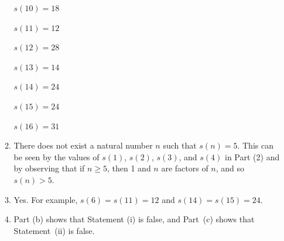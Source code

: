 \documentclass[11pt]{article}
\begin{document}
\begin{enumerate}
\begin{enumerate}
\begin{multicols}{4}
$s( {10} ) = 18$	

$s( {11} ) = 12$	

$s( {12} ) = 28$

$s( {13} ) = 14$	

$s( {14} ) = 24$	

$s( 15 ) = 24$	

$s( {16} ) = 31$
\end{multicols}


\item There does not exist a natural number  $n$  such that  $s( n ) = 5$.  This can be seen by the values of  $s( 1 )$, $s( 2 )$, $s( 3 )$, and 
$s( 4 )$ in Part (2) and by observing that if  $n \geq 5$, then  1  and  $n$  are factors of  $n$, and so  $s( n ) > 5$.

\item Yes.  For example,  $s( 6 ) = s( {11} ) = 12$ and  
$s( {14} ) = s( {15} ) = 24$.

\item Part (b) shows that Statement (i) is false, and Part~(c) shows that Statement~(ii) is false.
\end{enumerate}
\end{enumerate}
\hbreak
\end{document}
